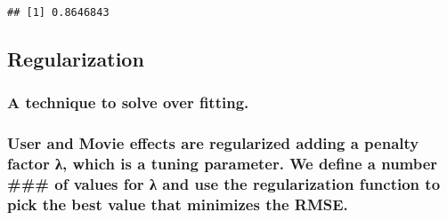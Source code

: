\documentclass[
]{article}
\newenvironment{Shaded}{\begin{snugshade}}{\end{snugshade}}
\newcommand{\DataTypeTok}[1]{\textcolor[rgb]{0.13,0.29,0.53}{#1}}
\newcommand{\DecValTok}[1]{\textcolor[rgb]{0.00,0.00,0.81}{#1}}
\newcommand{\KeywordTok}[1]{\textcolor[rgb]{0.13,0.29,0.53}{\textbf{#1}}}
\newcommand{\NormalTok}[1]{#1}
\newcommand{\OperatorTok}[1]{\textcolor[rgb]{0.81,0.36,0.00}{\textbf{#1}}}
\newcommand{\StringTok}[1]{\textcolor[rgb]{0.31,0.60,0.02}{#1}}
\begin{document}
\begin{verbatim}
## [1] 0.8646843
\end{verbatim}

\hypertarget{regularization}{%
\subsection{Regularization}\label{regularization}}

\hypertarget{a-technique-to-solve-over-fitting.}{%
\subsubsection{A technique to solve over
fitting.}\label{a-technique-to-solve-over-fitting.}}

\hypertarget{user-and-movie-effects-are-regularized-adding-a-penalty-factor-ux3bb-which-is-a-tuning-parameter.-we-define-a-number-of-values-for-ux3bb-and-use-the-regularization-function-to-pick-the-best-value-that-minimizes-the-rmse.}{%
\subsubsection{User and Movie effects are regularized adding a penalty
factor λ, which is a tuning parameter. We define a number \#\#\# of
values for λ and use the regularization function to pick the best value
that minimizes the
RMSE.}\label{user-and-movie-effects-are-regularized-adding-a-penalty-factor-ux3bb-which-is-a-tuning-parameter.-we-define-a-number-of-values-for-ux3bb-and-use-the-regularization-function-to-pick-the-best-value-that-minimizes-the-rmse.}}

\begin{Shaded}
\end{Shaded}
\end{document}
